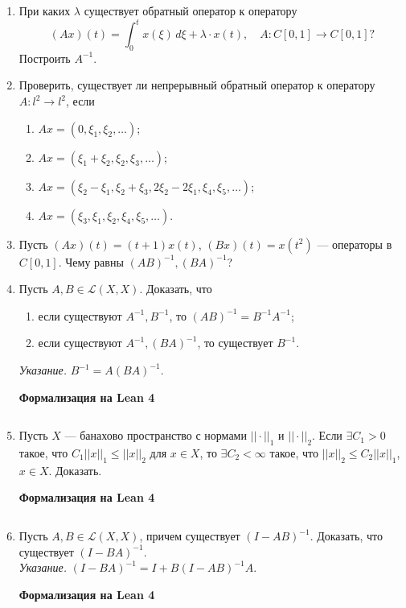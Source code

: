 \documentclass[12pt,a4paper]{article}
\begin{document}
\begin{enumerate}
\item При каких $\lambda$ существует обратный оператор к оператору
$$(Ax)(t) = \int_{0}^{t} x(\xi) \, d\xi + \lambda \cdot x(t), \quad A: C[0,1] \rightarrow C[0,1] ?$$
Построить $A^{-1}$.

\item Проверить, существует ли непрерывный обратный оператор к оператору $A: l^{2} \rightarrow l^{2}$, если
\begin{enumerate}[label=\alph*)]
\item $Ax = (0, \xi_{1}, \xi_{2}, \dots)$;
\item $Ax = (\xi_{1} + \xi_{2}, \xi_{2}, \xi_{3}, \dots)$;
\item $Ax = (\xi_{2} - \xi_{1}, \xi_{2} + \xi_{3}, 2\xi_{2} - 2\xi_{1}, \xi_{4}, \xi_{5}, \dots)$;
\item $Ax = (\xi_{3}, \xi_{1}, \xi_{2}, \xi_{4}, \xi_{5}, \dots)$.
\end{enumerate}

\item Пусть $(Ax)(t) = (t+1)x(t)$, $(Bx)(t) = x(t^{2})$ — операторы в $C[0,1]$. Чему равны $(AB)^{-1}, (BA)^{-1}$?

\newpage
\item Пусть $A, B \in \mathcal{L}(X,X)$. Доказать, что
\begin{enumerate}[label=\alph*)]
\item если существуют $A^{-1}, B^{-1}$, то $(AB)^{-1} = B^{-1}A^{-1}$;
\item если существуют $A^{-1}, (BA)^{-1}$, то существует $B^{-1}$.
\end{enumerate}
\textit{Указание.} $B^{-1} = A(BA)^{-1}$.


\begin{center}\small\textbf{Формализация на Lean 4}\end{center}
\inputminted{lean}{FunAn/Section15_InverseOperators/Task09.lean}

\newpage
\item Пусть $X$ — банахово пространство с нормами $|| \cdot ||_{1}$ и $|| \cdot ||_{2}$. Если $\exists C_{1} > 0$ такое, что $C_{1}||x||_{1} \le ||x||_{2}$ для $x \in X$, то $\exists C_{2} < \infty$ такое, что $||x||_{2} \le C_{2}||x||_{1}$, $x \in X$. Доказать.


\begin{center}\small\textbf{Формализация на Lean 4}\end{center}
\inputminted{lean}{FunAn/Section15_InverseOperators/Task10.lean}

\newpage
\item Пусть $A, B \in \mathcal{L}(X,X)$, причем существует $(I - AB)^{-1}$. Доказать, что существует $(I - BA)^{-1}$.\\
\textit{Указание.} $(I - BA)^{-1} = I + B(I - AB)^{-1}A$.

\begin{center}\small\textbf{Формализация на Lean 4}\end{center}
\inputminted{lean}{FunAn/Section15_InverseOperators/Task11.lean}

\end{enumerate}
\end{document}
